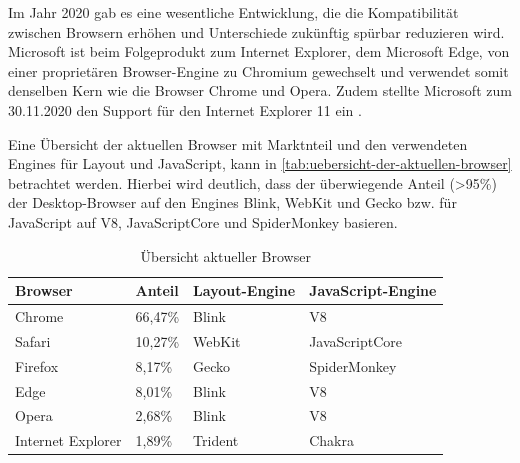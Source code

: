 Im Jahr 2020 gab es eine wesentliche Entwicklung, die die Kompatibilität zwischen Browsern erhöhen und Unterschiede zukünftig spürbar reduzieren wird. Microsoft ist beim Folgeprodukt zum Internet Explorer, dem Microsoft Edge, von einer proprietären Browser-Engine zu Chromium gewechselt \cite{MicrosoftEdgeChromium} und verwendet somit denselben Kern wie die Browser Chrome und Opera. Zudem stellte Microsoft zum 30.11.2020 den Support für den Internet Explorer 11 ein \cite{MicrosoftInternetExplorerDeprecation}.

Eine Übersicht der aktuellen Browser mit Marktnteil und den verwendeten Engines für Layout und JavaScript, kann in \autoref{tab:uebersicht-der-aktuellen-browser} betrachtet werden. Hierbei wird deutlich, dass der überwiegende Anteil (>95\%) der Desktop-Browser auf den Engines Blink, WebKit und Gecko bzw. für JavaScript auf V8, JavaScriptCore und SpiderMonkey basieren.

\begin{table}[H]
\centering
\begin{tabular}{|l|l|l|l|}
  \hline
  Browser & Anteil        & Layout-Engine  & JavaScript-Engine \\
  \hline
  Chrome  & 66,47\%       & Blink          & V8                \\
  \hline
  Safari  & 10,27\%       & WebKit         & JavaScriptCore    \\
  \hline
  Firefox & 8,17\%        & Gecko          & SpiderMonkey      \\
  \hline
  Edge    & 8,01\%        & Blink          & V8                \\
  \hline
  Opera   & 2,68\%        & Blink          & V8                \\
  \hline
  Internet Explorer & 1,89\% & Trident     & Chakra            \\
  \hline
\end{tabular}
\caption{Übersicht aktueller Browser \cite{StatCounterBrowserMarketshare} \cite{CompatibilityAndDefaults}}
	\label{tab:uebersicht-der-aktuellen-browser}
\end{table}